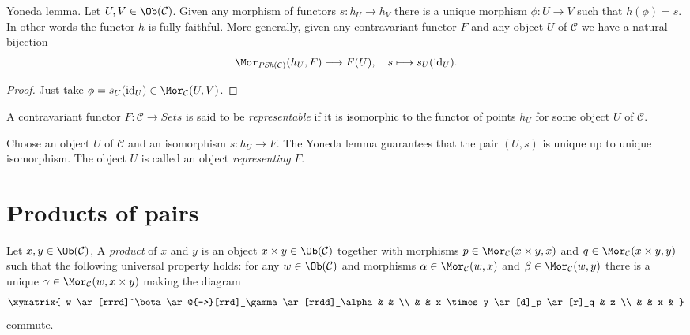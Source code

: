 \begin{lemma}
\label{lemma-yoneda}
Yoneda lemma.
Let $U, V \in \Ob(\mathcal{C})$.
Given any morphism of functors $s : h_U \to h_V$
there is a unique morphism $\phi : U \to V$
such that $h(\phi) = s$. In other words the
functor $h$ is fully faithful. More generally,
given any contravariant functor $F$ and any object
$U$ of $\mathcal{C}$ we have a natural bijection
$$
\Mor_{\textit{PSh}(\mathcal{C})}(h_U, F) \longrightarrow F(U),
\quad
s \longmapsto s_U(\text{id}_U).
$$
\end{lemma}

\begin{proof}
Just take $\phi = s_U(\text{id}_U) \in \Mor_\mathcal{C}(U, V)$.
\end{proof}

\begin{definition}
\label{definition-representable-functor}
A contravariant functor $F : \mathcal{C}\to \textit{Sets}$ is said
to be {\it representable} if it is isomorphic to the functor of
points $h_U$ for some object $U$ of $\mathcal{C}$.
\end{definition}

\noindent
Choose an object $U$ of $\mathcal{C}$ and an isomorphism $s : h_U \to F$.
The Yoneda lemma guarantees that the pair $(U, s)$
is unique up to unique isomorphism. The object
$U$ is called an object {\it representing} $F$.






\section{Products of pairs}
\label{section-products-pairs}

\begin{definition}
\label{definition-products}
Let $x, y\in \Ob(\mathcal{C})$,
A {\it product} of $x$ and $y$ is
an object $x \times y \in \Ob(\mathcal{C})$
together with morphisms
$p\in \Mor_{\mathcal C}(x \times y, x)$ and
$q\in\Mor_{\mathcal C}(x \times y, y)$ such
that the following universal property holds: for
any $w\in \Ob(\mathcal{C})$ and morphisms
$\alpha \in \Mor_{\mathcal C}(w, x)$ and
$\beta \in \Mor_\mathcal{C}(w, y)$
there is a unique
$\gamma\in \Mor_{\mathcal C}(w, x \times y)$ making
the diagram
$$
\xymatrix{
w \ar[rrrd]^\beta \ar@{-->}[rrd]_\gamma \ar[rrdd]_\alpha & & \\
& & x \times y \ar[d]_p \ar[r]_q & z \\
& & x &
}
$$
commute.
\end{definition}

